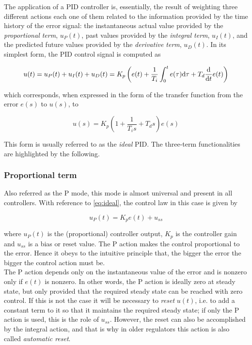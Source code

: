 The application of a PID controller is, essentially, the result of weighting three different actions each one of them related to the information provided by the time history of the error signal: the instantaneous actual value provided by the  \emph{proportional term}, $u_P(t)$, past values provided by the \emph{integral term}, $u_I(t)$, and the predicted future values provided by the \emph{derivative term}, $u_D(t)$.  In its simplest form, the PID control signal is computed as

\begin{equation}
u(t)=u_P(t)+u_I(t)+u_D(t)= K_p \left ( e(t)+\frac{1}{T_i}\int_0^t e(\tau)\mathrm{d} \tau+T_d\frac{\mathrm{d}}{\mathrm{d} t}e(t) \right )
\end{equation}

\noindent which corresponds, when expressed in the form of the transfer function from the error $e(s)$ to $u(s)$, to

\begin{equation}
u(s)=K_p \left ( 1+\frac{1}{T_is}+{T_ds} \right )  e(s)
\label{eq:ideal}
\end{equation}

This form is usually referred to as the \emph{ideal} PID. The three-term functionalities are highlighted by the following.

\subsubsection*{Proportional term}

Also referred as the P mode, this mode is almost universal and present in all controllers. With reference to \eqref{eq:ideal}, the control law in this case is given by

\[u_P (t) = K_pe(t) + u_{ss}\]

\noindent where $u_P(t)$ is the (proportional) controller output, $K_p$ is the controller gain and $u_{ss}$ is a bias or reset value. The P action makes the control proportional to the error. Hence it obeys to the intuitive principle that, the bigger the error the bigger the control action must be.\\

The P action depends only on the instantaneous value of the error and is nonzero only if $e(t)$ is nonzero. In other words, the P action is ideally zero at steady state, but only provided that the required steady state can be reached with zero control. If this is not the case it will be necessary to \emph{reset} $u(t)$, i.e. to add a constant term to it so that it maintains the required steady state; if only the P action is used, this is the role of $u_{ss}$. However, the reset can also be accomplished by the integral action, and that is why  in older regulators this action is also called \emph{automatic reset}. 


